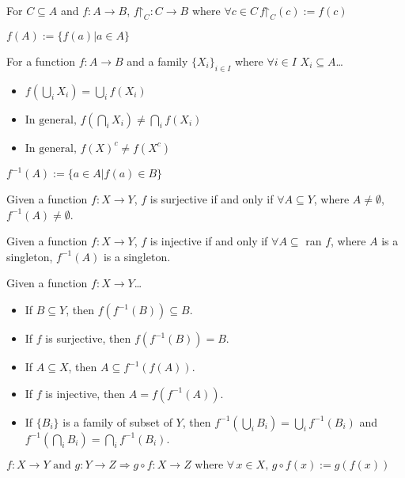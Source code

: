 \label{restriction}
For $C \subseteq A$ and $f:A \rightarrow B$, $\ensuremath{f\mathord{\upharpoonright}_C:C \rightarrow B}$ where \mbox{$\forall c \in C \, \ensuremath{f\mathord{\upharpoonright}_C(c)} := f(c)$}

\label{image}
$f(A) := \{f(a) | a \in A \}$

\begin{proposition}
For a function $f : A \rightarrow B$ and a family $\{X_i\}_{i \in I}$ where $\forall i \in I$ $X_i \subseteq A$\dots
\begin{itemize}
  \item $f(\bigcup_i X_i) = \bigcup_i f(X_i)$
  \item $\textrm{In general, } f(\bigcap_i X_i) \neq \bigcap_i f(X_i)$
  \item $\textrm{In general, } f(X)^c \neq f(X^c)$
\end{itemize}
\end{proposition}

\label{preimage}
$f^{-1}(A) := \{a \in A | f(a) \in B \}$

\begin{proposition}
Given a function $f: X \rightarrow Y$, $f$ is surjective if and only if $\forall A \subseteq Y$, where $A \neq \emptyset$, $f^{-1}(A) \neq \emptyset$.
\end{proposition}

\begin{proposition}
Given a function $f: X \rightarrow Y$, $f$ is injective if and only if $\forall A \subseteq$ ran $f$, where $A$ is a singleton, $f^{-1}(A)$ is a singleton.
\end{proposition}

\begin{proposition}
Given a function $f : X \rightarrow Y$\dots
\begin{itemize}
  \item If $B \subseteq Y$, then $f(f^{-1}(B)) \subseteq B.$
  \item If $f$ is surjective, then $f(f^{-1}(B)) = B.$
  \item If $A \subseteq X$, then $A \subseteq f^{-1}(f(A)).$
  \item If $f$ is injective, then $A = f(f^{-1}(A)).$
  \item If $\{B_i\}$ is a family of subset of $Y$, then $f^{-1}(\bigcup_i B_i)=\bigcup_i f^{-1}(B_i)$ and $f^{-1}(\bigcap_i B_i)=\bigcap_i f^{-1}(B_i).$
\end{itemize}
\end{proposition}

\label{functioncomposition}
$f:X \rightarrow Y \textrm{ and } g:Y \rightarrow Z \Rightarrow g \circ f:X \rightarrow Z \textrm{ where } \forall \, x \in X, \, g \circ f(x) := g(f(x))$

